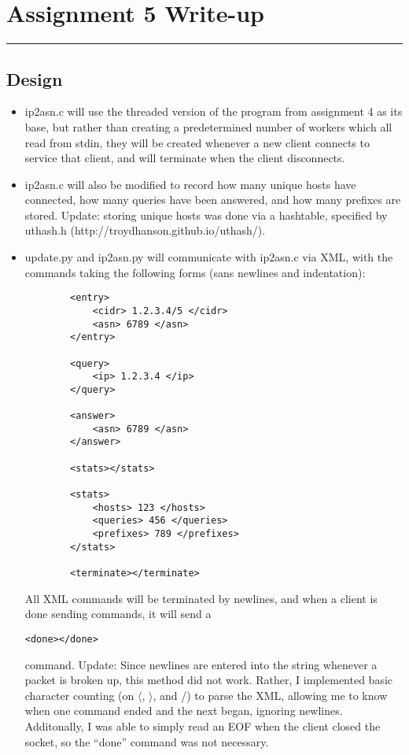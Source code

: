 \documentclass[letterpaper,10pt,fleqn]{article}
\numberwithin{equation}{section}
\begin{document}

\section*{Assignment 5 Write-up}
\hrule

\subsection*{Design}
\begin{itemize}
    \item ip2asn.c will use the threaded version of the program from assignment 4 as its base, but rather than creating a predetermined number of workers which all read from stdin, they will be created whenever a new client connects to service that client, and will terminate when the client disconnects.
    \item ip2asn.c will also be modified to record how many unique hosts have connected, how many queries have been answered, and how many prefixes are stored.  Update: storing unique hosts was done via a hashtable, specified by uthash.h (http://troydhanson.github.io/uthash/).
    \item update.py and ip2asn.py will communicate with ip2asn.c via XML, with the commands taking the following forms (sans newlines and indentation):
    \begin{verbatim}
        <entry>
            <cidr> 1.2.3.4/5 </cidr>
            <asn> 6789 </asn>
        </entry>

        <query>
            <ip> 1.2.3.4 </ip>
        </query>

        <answer>
            <asn> 6789 </asn>
        </answer>

        <stats></stats>

        <stats>
            <hosts> 123 </hosts>
            <queries> 456 </queries>
            <prefixes> 789 </prefixes>
        </stats>

        <terminate></terminate>
    \end{verbatim}
    All XML commands will be terminated by newlines, and when a client is done sending commands, it will send a \begin{verbatim}<done></done>\end{verbatim} command.  Update: Since newlines are entered into the string whenever a packet is broken up, this method did not work.  Rather, I implemented basic character counting (on \(\langle\), \(\rangle\), and /) to parse the XML, allowing me to know when one command ended and the next began, ignoring newlines.  Additonally, I was able to simply read an EOF when the client closed the socket, so the ``done'' command was not necessary.
\end{itemize}
\end{document}
